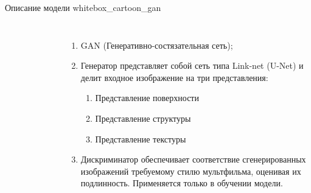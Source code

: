 \documentclass[aspectratio=169,xcolor=dvipsnames]{beamer}
\begin{document}
\begin{frame}{Описание модели whitebox\_cartoon\_gan}
    \begin{columns}[c] %

        \begin{figure}[h]
            \label{ris:ORTModelData}
        \end{figure}

        \begin{enumerate}
            \item GAN (Генеративно-состязательная сеть);
            \item Генератор представляет собой сеть типа Link-net (U-Net) и делит входное изображение на три представления:
                \begin{enumerate} 
                \item Представление поверхности
                \item Представление структуры
                \item Представление текстуры
                \end{enumerate}
            \item Дискриминатор обеспечивает соответствие сгенерированных изображений требуемому стилю мультфильма, оценивая их подлинность. Применяется только в обучении модели.
        \end{enumerate}

    \end{columns}
\end{frame}
\end{document}
